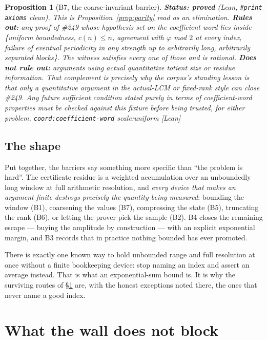 \documentclass[11pt]{article}
\theoremstyle{breakplain}
\newtheorem{prop}[thm]{Proposition}
\theoremstyle{breakdefinition}
\theoremstyle{breakdefinition}
\newcommand{\ev}[1]{{\small\textsf{[#1]}}\xspace}
\newcommand{\scale}[1]{{\small\textsf{scale:#1}}\xspace}
\newcommand{\coord}[1]{\texorpdfstring{{\small\nolinkurl{coord:#1}}}{coord:#1}\xspace}
\begin{document}
\begin{prop}[B7, the coarse-invariant barrier]
\label{prop:b7}
\textbf{Status: proved} (Lean, \texttt{\#print axioms} clean). This is
Proposition~\ref{prop:parity} read as an elimination.
\textbf{Rules out:} any proof of \#249 whose hypothesis set on the coefficient
word lies inside \{uniform boundedness, $c(n) \le n$, agreement with $\varphi$
mod $2$ at every index, failure of eventual periodicity in any strength up to
arbitrarily long, arbitrarily separated blocks\}. The witness satisfies every
one of those and is rational.
\textbf{Does not rule out:} arguments using actual quantitative totient size or
residue information. That complement is precisely why the corpus's standing
lesson is that only a quantitative argument in the actual-LCM or fixed-rank
style can close \#249. Any future sufficient condition stated purely in terms
of coefficient-word properties must be checked against this fixture before
being trusted, for either problem.
\coord{coefficient-word} \scale{uniform} \ev{Lean}
\end{prop}

\subsection{The shape}

Put together, the barriers say something more specific than ``the problem is
hard''. The certificate residue is a weighted accumulation over an unboundedly
long window at full arithmetic resolution, and \emph{every device that makes an
argument finite destroys precisely the quantity being measured}: bounding the
window (B1), coarsening the values (B7), compressing the state (B5),
truncating the rank (B6), or letting the prover pick the sample (B2). B4
closes the remaining escape --- buying the amplitude by construction --- with
an explicit exponential margin, and B3 records that in practice nothing
bounded has ever promoted.

There is exactly one known way to hold unbounded range and full resolution at
once without a finite bookkeeping device: stop naming an index and assert an
average instead. That is what an exponential-sum bound is. It is why the
surviving routes of \S\ref{sec:survivors} are, with the honest exceptions noted
there, the ones that never name a good index.

\section{What the wall does not block}
\label{sec:survivors}
\end{document}
